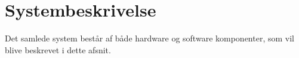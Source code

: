 \clearpage
\section{Systembeskrivelse}

Det samlede system består af både hardware og software komponenter, som vil blive beskrevet i dette afsnit.

